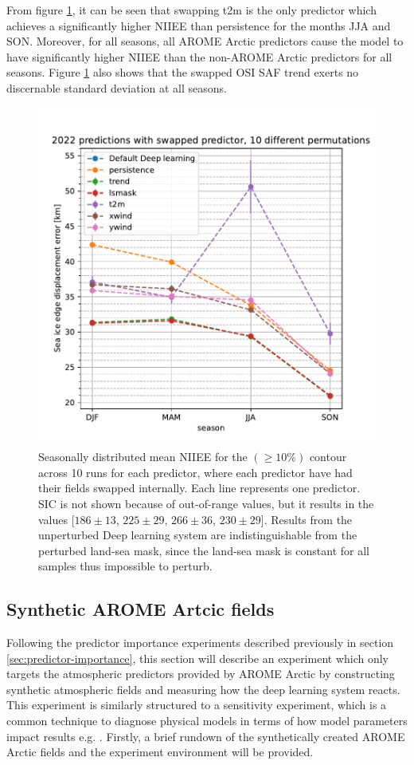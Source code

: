 \documentclass[../main/thesis.tex]{subfiles}
\begin{document}
From figure \ref{fig:swapped}, it can be seen that swapping t2m is the only predictor which achieves a significantly higher NIIEE than persistence for the months JJA and SON. Moreover, for all seasons, all AROME Arctic predictors cause the model to have significantly higher NIIEE than the non-AROME Arctic predictors for all seasons. Figure \ref{fig:swapped} also shows that the swapped OSI SAF trend exerts no discernable standard deviation at all seasons.


\begin{figure}
    \centering
    \includegraphics[width=\textwidth]{swapped.pdf}
    \caption{\label{fig:swapped}Seasonally distributed mean NIIEE for the $(\geq10\%)$ contour across 10 runs for each predictor, where each predictor have had their fields swapped internally. Each line represents one predictor. SIC is not shown because of out-of-range values, but it results in the values [$186 \pm 13$, $225 \pm 29$, $266 \pm 36$, $230 \pm 29$]. Results from the unperturbed Deep learning system are indistinguishable from the perturbed land-sea mask, since the land-sea mask is constant for all samples thus impossible to perturb.}
\end{figure}

\subsection{Synthetic AROME Artcic fields}
\label{sec:synthetic_preds}
Following the predictor importance experiments described previously in section \ref{sec:predictor-importance}, this section will describe an experiment which only targets the atmospheric predictors provided by AROME Arctic by constructing synthetic atmospheric fields and measuring how the deep learning system reacts. This experiment is similarly structured to a sensitivity experiment, which is a common technique to diagnose physical models in terms of how model parameters impact results e.g. \citep{Kim2006}. Firstly, a brief rundown of the synthetically created AROME Arctic fields and the experiment environment will be provided.
\end{document}
